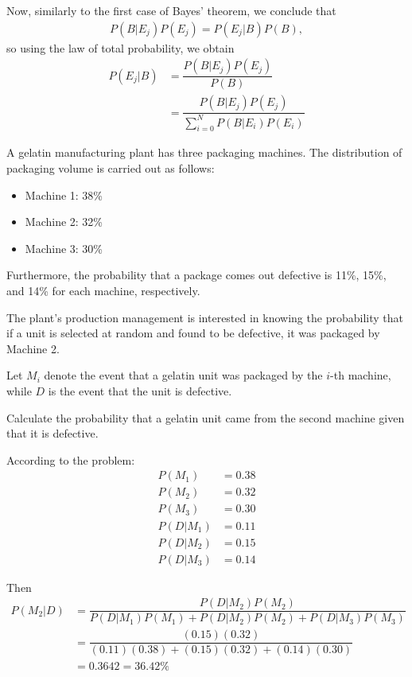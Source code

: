Now, similarly to the first case of Bayes' theorem, we conclude that 
\begin{align}
	P(B|E_j)P(E_j)= P(E_j|B)P(B),
\end{align}
so using the law of total probability, we obtain
\begin{align}
	P(E_j|B)&= \dfrac{P(B|E_j)P(E_j)}{P(B)}\\
	&=\dfrac{P(B|E_j)P(E_j)}{\sum_{i=0}^{N} P(B|E_i)P(E_i)}
\end{align}

\begin{example}
	A gelatin manufacturing plant has three packaging machines. The distribution of packaging volume is carried out as follows:
	\begin{itemize}
		\item Machine 1: 38\%
		\item Machine 2: 32\%
		\item Machine 3: 30\%
	\end{itemize}
	
	Furthermore, the probability that a package comes out defective is 11\%, 15\%, and 14\% for each machine, respectively. 
	
	The plant's production management is interested in knowing the probability that if a unit is selected at random and found to be defective, it was packaged by Machine 2. 

	Let $ M_i $ denote the event that a gelatin unit was packaged by the $ i $-th machine, while $ D $ is the event that the unit is defective. 
	
	Calculate the probability that a gelatin unit came from the second machine given that it is defective. 
\end{example}
	
\begin{solution}
	
	According to the problem:
	\begin{align}
		P(M_1)&=0.38\\
		P(M_2)&=0.32\\
		P(M_3)&=0.30\\
		P(D|M_1)&=0.11\\
		P(D|M_2)&=0.15\\
		P(D|M_3)&=0.14
	\end{align}
	
	Then 
	\begin{align}
		P(M_2|D) &= \dfrac{P(D|M_2)P(M_2)}{	P(D|M_1)P(M_1)+P(D|M_2)P(M_2)+P(D|M_3)P(M_3)
		}\\
		&= \dfrac{(0.15)(0.32)}{
			(0.11)(0.38)+(0.15)(0.32)+(0.14)(0.30)	
		}\\
		&=0.3642=36.42\%
	\end{align}
\end{solution}

